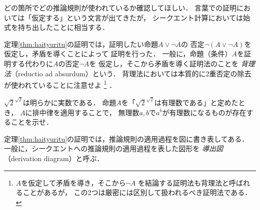  どの箇所でどの推論規則が使われているか確認してほしい．
 言葉での証明においては「仮定する」という文言が出てきたが，
 シークエント計算においては始式を持ち出したことに相当する．
 
 定理\ref{thm:haityuritu}の証明では，証明したい命題$A \lor \lnot A$の
 否定$\lnot ( A \lor \lnot A )$を仮定し，矛盾を導くことによって
 証明を行った．
 一般に，命題（条件）$A$を証明する代わりに$A$の否定$\lnot A$を
 仮定し，そこから矛盾を導く証明法のことを
 \emph{背理法}（reductio ad absurdum）という．
 背理法においては本質的に2重否定の除去が使われていることに注意せよ
 \footnote{$A$を仮定して矛盾を導き，そこから$\lnot A$
 を結論する証明法も背理法と呼ばれることがあるが，
 この2つは厳密には区別して扱われるべき証明法である．}
 ．
 
 \begin{que} \label{que:haityurituouyou}
   $\sqrt{2} ^{\sqrt{2}}$は明らかに実数である．
   命題$A$を「$\sqrt{2}^{\sqrt{2}}$は有理数である」と定めたとき，
   $A$に排中律を適用することで，
   無理数$a,  b$で$a^b$が有理数になるものが存在することを示せ．
 \end{que}

 定理\ref{thm:haityuritu}の証明では，推論規則の適用過程を図に書き表してある．
 一般に，シークエントへの推論規則の適用過程を表した図形を
 \emph{導出図}（derivation diagram）と呼ぶ．

